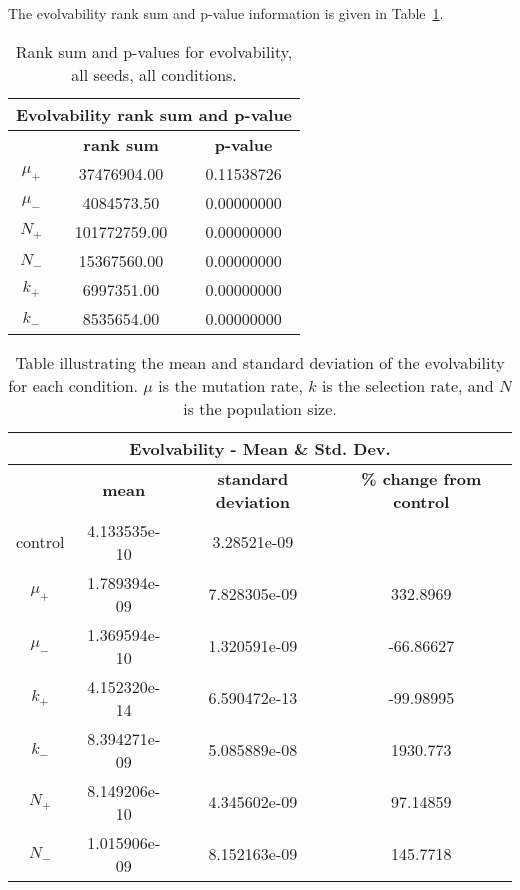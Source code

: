 The evolvability rank sum and p-value information is given in Table~\ref{table:evolvability-rank_sum_and_p-values}.

\begin{table}[H]
	\begin{tabular}{|c|c|c|}
		\hline
		\multicolumn{3}{c}{\Large \textbf{Evolvability rank sum and p-value}} \\
		\hline
		& \textbf{rank sum} & \textbf{p-value} \\
		\hline
		$\mu_+$ & 37476904.00 & 0.11538726 \\ 
		\hline
		$\mu_-$ & 4084573.50 & 0.00000000 \\ 
		\hline
		$N_+$ & 101772759.00 & 0.00000000 \\ 
		\hline
		$N_-$ & 15367560.00 & 0.00000000 \\ 
		\hline
		$k_+$ & 6997351.00 & 0.00000000 \\ 
		\hline
		$k_-$ & 8535654.00 & 0.00000000 \\ 
		\hline
	\end{tabular}
	\caption[Evolvability - rank sum and p-value]{Rank sum and p-values for evolvability, all seeds, all conditions.}
	\label{table:evolvability-rank_sum_and_p-values}
\end{table}

\begin{table}[H]
	\centering
	\begin{tabular}{| c | c | c | c |}
		\hline
		\multicolumn{4}{c}{\Large Evolvability - Mean \& Std. Dev.} \\
		\hline
		& \textbf{mean} & \textbf{standard deviation} & \textbf{\% change from control} \\
		\hline
		\hline
		control & 4.133535e-10 & 3.28521e-09 & \textemdash \\ 
		\hline
		$\mu_+$ & 1.789394e-09 & 7.828305e-09 & 332.8969 \\ 
		\hline
		$\mu_-$ & 1.369594e-10 & 1.320591e-09 & -66.86627 \\ 
		\hline
		$k_+$ & 4.152320e-14 & 6.590472e-13 & -99.98995 \\ 
		\hline
		$k_-$ & 8.394271e-09 & 5.085889e-08 & 1930.773 \\ 
		\hline
		$N_+$ & 8.149206e-10 & 4.345602e-09 & 97.14859 \\ 
		\hline
		$N_-$ & 1.015906e-09 & 8.152163e-09 & 145.7718 \\ 
		\hline	 		 
	\end{tabular}
	\caption[Evolvability mean and standard deviation]{Table illustrating the mean and standard deviation of the evolvability for each condition. $\mu$ is the mutation rate, $k$ is the selection rate, and $N$ is the population size.}
	\label{table:mean_std_dev_evolvability}
\end{table}

